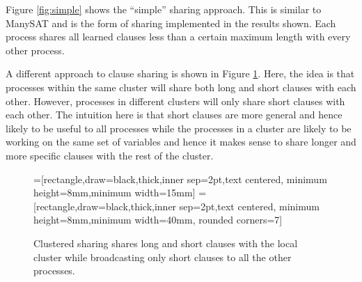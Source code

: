 \documentclass[letterpaper, compsoc, conference]{IEEEtran}
\begin{document}
Figure \ref{fig:simple} shows the ``simple'' sharing approach. This is similar
to ManySAT and is the form of sharing implemented in the results shown. Each
process shares all learned clauses less than a certain maximum length with
every other process.

A different approach to clause sharing is shown in Figure \ref{fig:cluster}.
Here, the idea is that processes within the same cluster will share both long
and short clauses with each other. However, processes in different clusters
will only share short clauses with each other. The intuition here is that short
clauses are more general and hence likely to be useful to all processes while
the processes in a cluster are likely to be working on the same set of
variables and hence it makes sense to share longer and more specific clauses
with the rest of the cluster.

\begin{figure}[htbp]
    =[rectangle,draw=black,thick,inner sep=2pt,text centered,
                     minimum height=8mm,minimum width=15mm]
    =[rectangle,draw=black,thick,inner sep=2pt,text centered,
                        minimum height=8mm,minimum width=40mm, rounded corners=7]
    \begin{center}
    \end{center}
    \caption{Clustered sharing shares long and short clauses with the local cluster 
             while broadcasting only short clauses to all the other processes.}
    \label{fig:cluster}
 \end{figure}
\end{document}
